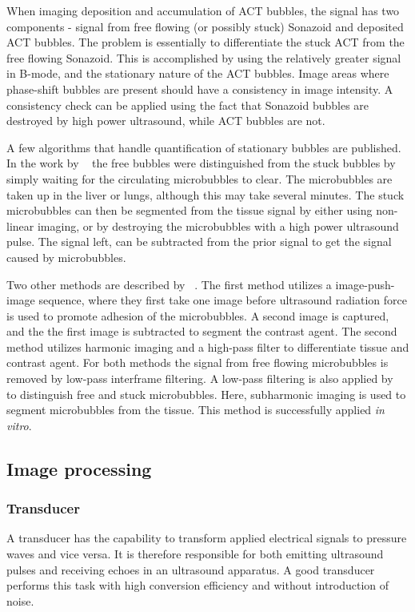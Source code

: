 When imaging deposition and accumulation of ACT\texttrademark{} bubbles, the signal has two components - signal from free flowing (or possibly stuck) Sonazoid\texttrademark{} and deposited ACT\texttrademark{} bubbles. The problem is essentially to differentiate the stuck ACT\texttrademark{} from the free flowing Sonazoid\texttrademark{}. This is accomplished by using the relatively greater signal in B-mode, and the stationary nature of the ACT\texttrademark{} bubbles. Image areas where phase-shift bubbles are present should have a consistency in image intensity. A consistency check can be applied using the fact that Sonazoid\texttrademark{} bubbles are destroyed by high power ultrasound, while ACT\texttrademark{} bubbles are not. 

A few algorithms that handle quantification of stationary bubbles are published. In the work by ~\citet{Rychak2006} the free bubbles were distinguished from the stuck bubbles by simply waiting for the circulating microbubbles to clear. The microbubbles are taken up in the liver or lungs, although this may take several minutes. The stuck microbubbles can then be segmented from the tissue signal by either using non-linear imaging, or by destroying the microbubbles with a high power ultrasound pulse. The signal left, can be subtracted from the prior signal to get the signal caused by microbubbles.

Two other methods are described by ~\citet{Zhao2007}. The first method utilizes a image-push-image sequence, where they first take one image before ultrasound radiation force is used to promote adhesion of the microbubbles. A second image is captured, and the the first image is subtracted to segment the contrast agent. The second method utilizes harmonic imaging and a high-pass filter to differentiate tissue and contrast agent. For both methods the signal from free flowing microbubbles is removed by low-pass interframe filtering. A low-pass filtering is also applied by ~\citet{Needles2009} to distinguish free and stuck microbubbles. Here, subharmonic imaging is used to segment microbubbles from the tissue. This method is successfully applied \textit{in vitro}.  
\clearpage   
\subsection{Image processing}
\subsubsection{Transducer}
A transducer has the capability to transform applied electrical signals to pressure waves and vice versa. It is therefore responsible for both emitting ultrasound pulses and receiving echoes in an ultrasound apparatus. A good transducer performs this task with high conversion efficiency and without introduction of noise. 

